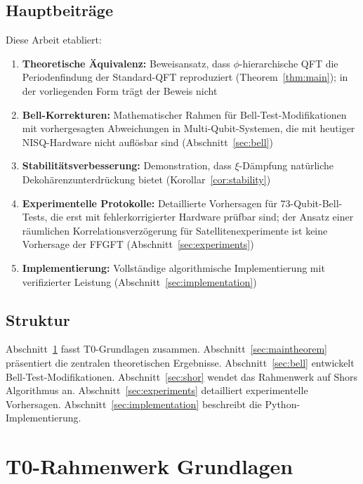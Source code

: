 \subsection{Hauptbeiträge}

Diese Arbeit etabliert:

\begin{enumerate}
	\item \textbf{Theoretische Äquivalenz:} Beweisansatz, dass $\phi$-hierarchische QFT die Periodenfindung der Standard-QFT reproduziert (Theorem~\ref{thm:main}); in der vorliegenden Form trägt der Beweis nicht
	\item \textbf{Bell-Korrekturen:} Mathematischer Rahmen für Bell-Test-Modifikationen mit vorhergesagten Abweichungen in Multi-Qubit-Systemen, die mit heutiger NISQ-Hardware nicht auflösbar sind (Abschnitt~\ref{sec:bell})
	\item \textbf{Stabilitätsverbesserung:} Demonstration, dass $\xi$-Dämpfung natürliche Dekohärenzunterdrückung bietet (Korollar~\ref{cor:stability})
	\item \textbf{Experimentelle Protokolle:} Detaillierte Vorhersagen für 73-Qubit-Bell-Tests, die erst mit fehlerkorrigierter Hardware prüfbar sind; der Ansatz einer räumlichen Korrelationsverzögerung für Satellitenexperimente ist keine Vorhersage der FFGFT (Abschnitt~\ref{sec:experiments})
	\item \textbf{Implementierung:} Vollständige algorithmische Implementierung mit verifizierter Leistung (Abschnitt~\ref{sec:implementation})
\end{enumerate}

\subsection{Struktur}

Abschnitt~\ref{sec:t0framework} fasst T0-Grundlagen zusammen. Abschnitt~\ref{sec:maintheorem} präsentiert die zentralen theoretischen Ergebnisse. Abschnitt~\ref{sec:bell} entwickelt Bell-Test-Modifikationen. Abschnitt~\ref{sec:shor} wendet das Rahmenwerk auf Shors Algorithmus an. Abschnitt~\ref{sec:experiments} detailliert experimentelle Vorhersagen. Abschnitt~\ref{sec:implementation} beschreibt die Python-Implementierung.

\section{T0-Rahmenwerk Grundlagen}
\label{sec:t0framework}

